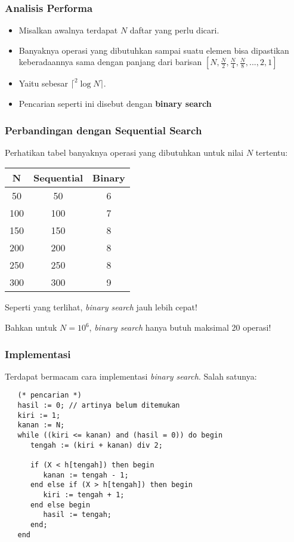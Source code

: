 \documentclass{beamer}
\begin{document}
\begin{frame}
\frametitle{Analisis Performa}
\begin{itemize}
	\item Misalkan awalnya terdapat $N$ daftar yang perlu dicari. 
	\item Banyaknya operasi yang dibutuhkan sampai suatu elemen bisa dipastikan keberadaannya sama dengan panjang dari barisan $[N, \frac{N}{2}, \frac{N}{4}, \frac{N}{8}, ..., 2, 1]$
	\item Yaitu sebesar $\lceil ^2\log{N} \rceil$.
	\item Pencarian seperti ini disebut dengan \alert{\textbf{binary search}}
\end{itemize}
\end{frame}

\begin{frame}
\frametitle{Perbandingan dengan Sequential Search}
Perhatikan tabel banyaknya operasi yang dibutuhkan untuk nilai $N$ tertentu:
\begin{table}[ht]
	\begin{tabular}{|c|c|c|}
		\hline N  & Sequential  & Binary \\ 
		\hline 50 & 50 & 6 \\ 
		\hline 100 & 100 & 7 \\
		\hline 150 & 150 & 8 \\
		\hline 200 & 200 & 8 \\
		\hline 250 & 250 & 8 \\
		\hline 300 & 300 & 9 \\
		\hline 
	\end{tabular}
\end{table} 
Seperti yang terlihat, \textit{binary search} jauh lebih cepat!

Bahkan untuk $N = 10^6$, \textit{binary search} hanya butuh maksimal 20 operasi!
\end{frame}

\begin{frame}[fragile]
\frametitle{Implementasi}
Terdapat bermacam cara implementasi \textit{binary search}. Salah satunya:
\begin{lstlisting}
   (* pencarian *)
   hasil := 0; // artinya belum ditemukan
   kiri := 1;
   kanan := N;
   while ((kiri <= kanan) and (hasil = 0)) do begin
      tengah := (kiri + kanan) div 2;
      
      if (X < h[tengah]) then begin
         kanan := tengah - 1;
      end else if (X > h[tengah]) then begin
         kiri := tengah + 1;
      end else begin
         hasil := tengah;
      end;
   end
\end{lstlisting}
\end{frame}
\end{document}
